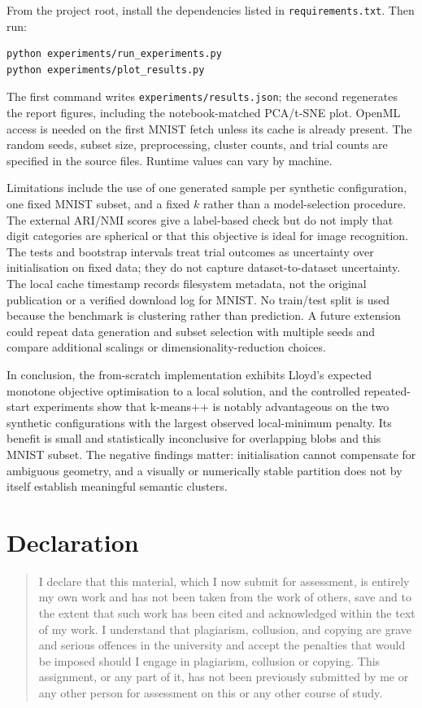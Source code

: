 \documentclass[10pt,a4paper]{article}
\begin{document}
From the project root, install the dependencies listed in \texttt{requirements.txt}. Then run:
\begin{lstlisting}
python experiments/run_experiments.py
python experiments/plot_results.py
\end{lstlisting}
The first command writes \texttt{experiments/results.json}; the second regenerates the report figures, including the notebook-matched PCA/t-SNE plot. OpenML access is needed on the first MNIST fetch unless its cache is already present. The random seeds, subset size, preprocessing, cluster counts, and trial counts are specified in the source files. Runtime values can vary by machine.

Limitations include the use of one generated sample per synthetic configuration, one fixed MNIST subset, and a fixed $k$ rather than a model-selection procedure. The external ARI/NMI scores give a label-based check but do not imply that digit categories are spherical or that this objective is ideal for image recognition. The tests and bootstrap intervals treat trial outcomes as uncertainty over initialisation on fixed data; they do not capture dataset-to-dataset uncertainty. The local cache timestamp records filesystem metadata, not the original publication or a verified download log for MNIST. No train/test split is used because the benchmark is clustering rather than prediction. A future extension could repeat data generation and subset selection with multiple seeds and compare additional scalings or dimensionality-reduction choices.

In conclusion, the from-scratch implementation exhibits Lloyd's expected monotone objective optimisation to a local solution, and the controlled repeated-start experiments show that k-means++ is notably advantageous on the two synthetic configurations with the largest observed local-minimum penalty. Its benefit is small and statistically inconclusive for overlapping blobs and this MNIST subset. The negative findings matter: initialisation cannot compensate for ambiguous geometry, and a visually or numerically stable partition does not by itself establish meaningful semantic clusters.

\section*{Declaration}
\begin{quote}\small
I declare that this material, which I now submit for assessment, is entirely my own work and has not been taken from the work of others, save and to the extent that such work has been cited and acknowledged within the text of my work. I understand that plagiarism, collusion, and copying are grave and serious offences in the university and accept the penalties that would be imposed should I engage in plagiarism, collusion or copying. This assignment, or any part of it, has not been previously submitted by me or any other person for assessment on this or any other course of study.
\end{quote}



\end{document}
